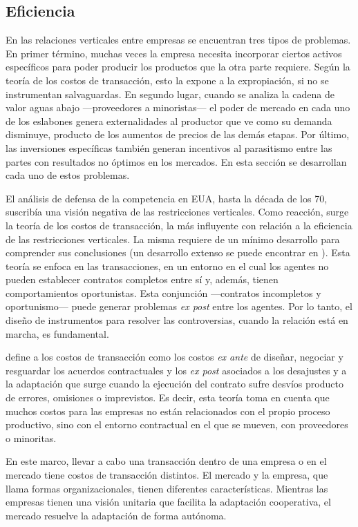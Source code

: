 \documentclass[
  12pt,
  spanish,
]{book}
\begin{document}
\hypertarget{eficiencia}{%
\subsection{Eficiencia}\label{eficiencia}}

En las relaciones verticales entre empresas se encuentran tres tipos de problemas. En primer término, muchas veces la empresa necesita incorporar ciertos activos específicos para poder producir los productos que la otra parte requiere. Según la teoría de los costos de transacción, esto la expone a la expropiación, si no se instrumentan salvaguardas. En segundo lugar, cuando se analiza la cadena de valor aguas abajo ---proveedores a minoristas--- el poder de mercado en cada uno de los eslabones genera externalidades al productor que ve como su demanda disminuye, producto de los aumentos de precios de las demás etapas. Por último, las inversiones específicas también generan incentivos al parasitismo entre las partes con resultados no óptimos en los mercados. En esta sección se desarrollan cada uno de estos problemas.

El análisis de defensa de la competencia en EUA, hasta la década de los 70, suscribía una visión negativa de las restricciones verticales. Como reacción, surge la teoría de los costos de transacción, la más influyente con relación a la eficiencia de las restricciones verticales. La misma requiere de un mínimo desarrollo para comprender sus conclusiones (un desarrollo extenso se puede encontrar en \citet{Williamson1998}). Esta teoría se enfoca en las transacciones, en un entorno en el cual los agentes no pueden establecer contratos completos entre sí y, además, tienen comportamientos oportunistas. Esta conjunción ---contratos incompletos y oportunismo--- puede generar problemas \emph{ex post} entre los agentes. Por lo tanto, el diseño de instrumentos para resolver las controversias, cuando la relación está en marcha, es fundamental.

\citet{Williamson1998} define a los costos de transacción como los costos \emph{ex ante} de diseñar, negociar y resguardar los acuerdos contractuales y los \emph{ex post} asociados a los desajustes y a la adaptación que surge cuando la ejecución del contrato sufre desvíos producto de errores, omisiones o imprevistos. Es decir, esta teoría toma en cuenta que muchos costos para las empresas no están relacionados con el propio proceso productivo, sino con el entorno contractual en el que se mueven, con proveedores o minoritas.

En este marco, llevar a cabo una transacción dentro de una empresa o en el mercado tiene costos de transacción distintos. El mercado y la empresa, que \citet{Williamson1998} llama formas organizacionales, tienen diferentes características. Mientras las empresas tienen una visión unitaria que facilita la adaptación cooperativa, el mercado resuelve la adaptación de forma autónoma.
\end{document}
